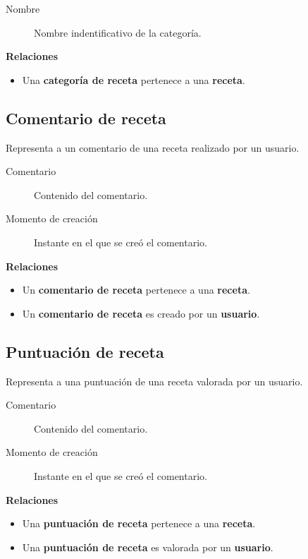 \begin{description}
\item[Nombre] Nombre indentificativo de la categoría.
\end{description}


\textbf{Relaciones}
\begin{itemize}
\item Una \textbf{categoría de receta} pertenece a una \textbf{receta}.
\end{itemize}


\subsection{Comentario de receta}

Representa a un comentario de una receta realizado por un usuario.

\begin{description}
\item[Comentario] Contenido del comentario.
\item[Momento de creación] Instante en el que se creó el comentario.
\end{description}


\textbf{Relaciones}
\begin{itemize}
\item Un \textbf{comentario de receta} pertenece a una \textbf{receta}.
\item Un \textbf{comentario de receta} es creado por un \textbf{usuario}.
\end{itemize}


\subsection{Puntuación de receta}

Representa a una puntuación de una receta valorada por un usuario.

\begin{description}
\item[Comentario] Contenido del comentario.
\item[Momento de creación] Instante en el que se creó el comentario.
\end{description}


\textbf{Relaciones}
\begin{itemize}
\item Una \textbf{puntuación de receta} pertenece a una \textbf{receta}.
\item Una \textbf{puntuación de receta} es valorada por un \textbf{usuario}.
\end{itemize}



